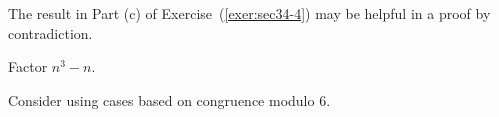 \begin{list}{\bf{\ref{exer:notperfectsquare}.}}
\item The result in Part (c) of Exercise~(\ref{exer:sec34-4}) may be helpful in a proof by contradiction.
\end{list}






\begin{list}{\bf{\ref{exer:sec34-2}.}}
\item \begin{list}{\bf{(b)}}
\item Factor $n^3 - n$.
\end{list}
\end{list}


\begin{list}{}
\item \begin{list}{\bf{(c)}}
\item Consider using cases based on congruence modulo 6.
\end{list}
\end{list}




\hbreak
\renewcommand{\labelenumi}{\textbf{\arabic{enumi}.}}
\endinput

